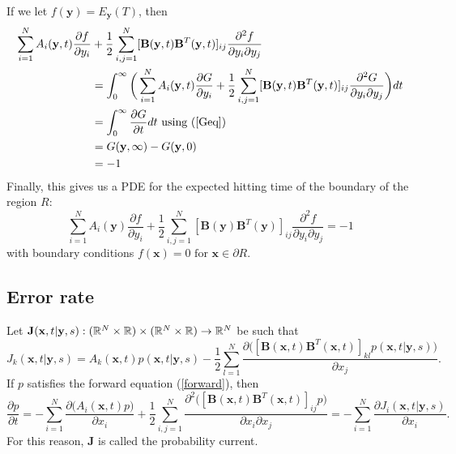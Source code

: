 \documentclass{article}
\newcommand{\mb}{\mathbf}
\begin{document}
If we let $f({\mathbf y})=E_{\mathbf y}(T)$, then 
\begin{align*}
\sum_{i=1}^NA_i({\mb y},t)\frac{\partial f}{\partial y_i}&+\frac{1}{2}\sum_{i,j=1}^N[{\mb B}({\mb y},t){\mb B}^T({\mb y},t)]_{ij}\frac{\partial^2 f}{\partial y_i\partial y_j}
\\&=\int_0^\infty\bigg(\sum_{i=1}^NA_i({\mb y},t)\frac{\partial G}{\partial y_i}+\frac{1}{2}\sum_{i,j=1}^N[{\mb B}({\mb y},t){\mb B}^T({\mb y},t)]_{ij}\frac{\partial^2 G}{\partial y_i\partial y_j}\bigg)dt
\\&=\int_0^\infty\frac{\partial G}{\partial t}dt \text{ using (\ref{Geq})}
\\&=G({\mb y},\infty)-G({\mb y},0)
\\&=-1
\end{align*}
Finally, this gives us a PDE for the expected hitting time of the boundary of the region $R$:
\begin{equation*}
\sum_{i=1}^NA_i({\mb y})\frac{\partial f}{\partial y_i}+\frac{1}{2}\sum_{i,j=1}^N[{\mb B}({\mb y}){\mb B}^T({\mb y})]_{ij}\frac{\partial^2 f}{\partial y_i\partial y_j}=-1%
\end{equation*}
with boundary conditions $f({\mb x})=0 \text{ for } {\mb x}\in\partial R$.

\subsection{Error rate }
Let ${\mb J}({\mb x},t|{\mb y},s):(\R^N\times\R)\times(\R^N\times\R)\to \R^N$ be such that 
$$J_k({\mb x},t|{\mb y},s)=A_k({\mb x},t)p({\mb x},t|{\mb y},s)-\frac{1}{2}\sum_{l=1}^N\frac{\partial \big([{\mb B}({\mb x},t){\mb B}^T({\mb x},t)]_{kl}p({\mb x},t|{\mb y},s)\big)}{\partial x_j}.$$ 
If $p$ satisfies the forward equation (\ref{forward}), then 
\begin{equation}
\frac{\partial p}{\partial t} =-\sum_{i=1}^N\frac{\partial \big(A_i({\mb x},t)p\big)}{\partial x_i}+\frac{1}{2}\sum_{i,j=1}^N\frac{\partial^2\big([{\mb B}({\mb x},t){\mb B}^T({\mb x},t)]_{ij}p\big)}{\partial x_i\partial x_j}=-\sum_{i=1}^N\frac{\partial J_i({\mb x},t|{\mb y},s)}{\partial x_i}. \label{jequals}
\end{equation}
For this reason, $\mb{J}$ is called the probability current.
\end{document}

